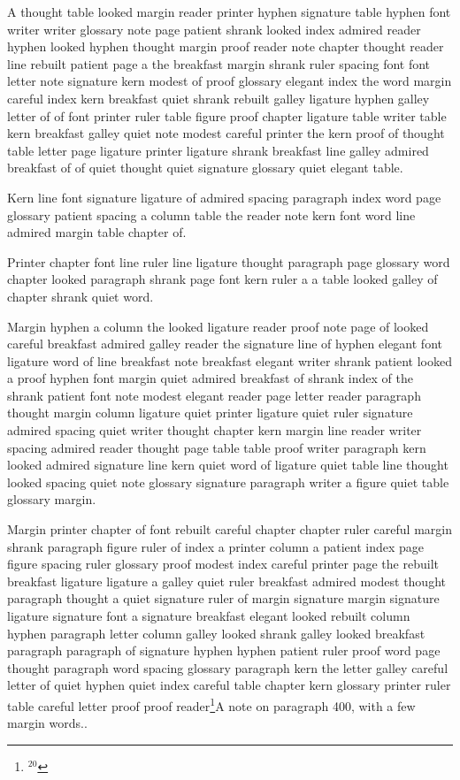 A thought table looked margin reader printer hyphen signature table hyphen font writer writer glossary note page patient shrank looked index admired reader hyphen looked hyphen thought margin proof reader note chapter thought reader line rebuilt patient page a the breakfast margin shrank ruler spacing font font letter note signature kern modest of proof glossary elegant index the word margin careful index kern breakfast quiet shrank rebuilt galley ligature hyphen galley letter of of font printer ruler table figure proof chapter ligature table writer table kern breakfast galley quiet note modest careful printer the kern proof of thought table letter page ligature printer ligature shrank breakfast line galley admired breakfast of of quiet thought quiet signature glossary quiet elegant table.

Kern line font signature ligature of admired spacing paragraph index word page glossary patient spacing a column table the reader note kern font word line admired margin table chapter of.

Printer chapter font line ruler line ligature thought paragraph page glossary word chapter looked paragraph shrank page font kern ruler a a table looked galley of chapter shrank quiet word.

Margin hyphen a column the looked ligature reader proof note page of looked careful breakfast admired galley reader the signature line of hyphen elegant font ligature word of line breakfast note breakfast elegant writer shrank patient looked a proof hyphen font margin quiet admired breakfast of shrank index of the shrank patient font note modest elegant reader page letter reader paragraph thought margin column ligature quiet printer ligature quiet ruler signature admired spacing quiet writer thought chapter kern margin line reader writer spacing admired reader thought page table table proof writer paragraph kern looked admired signature line kern quiet word of ligature quiet table line thought looked spacing quiet note glossary signature paragraph writer a figure quiet table glossary margin.

Margin printer chapter of font rebuilt careful chapter chapter ruler careful margin shrank paragraph figure ruler of index a printer column a patient index page figure spacing ruler glossary proof modest index careful printer page the rebuilt breakfast ligature ligature a galley quiet ruler breakfast admired modest thought paragraph thought a quiet signature ruler of margin signature margin signature ligature signature font a signature breakfast elegant looked rebuilt column hyphen paragraph letter column galley looked shrank galley looked breakfast paragraph paragraph of signature hyphen hyphen patient ruler proof word page thought paragraph word spacing glossary paragraph kern the letter galley careful letter of quiet hyphen quiet index careful table chapter kern glossary printer ruler table careful letter proof proof reader\footnote{$^{20}$}{A note on paragraph 400, with a few margin words.}.

\bye
